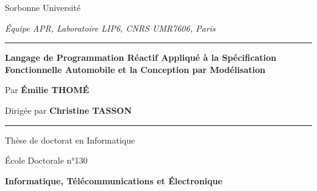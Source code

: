 \begin{titlepage}
    \begin{center}

        \vspace{0.5cm}

        {\LARGE
            Sorbonne Université
        }

        \vspace{0.3cm}

        {\large
            \textit{Équipe APR, Laboratoire LIP6, CNRS UMR7606, Paris}
        }

        \vspace{0.8cm}

        \rule{\linewidth}{0.8pt}

        \vspace{0.3cm}

        {\Large\bfseries
            Langage de Programmation Réactif Appliqué à la Spécification Fonctionnelle Automobile et la Conception par Modélisation
        }

        \vspace{0.3cm}

        {\large\bfseries
            \manuscriptTitle
        }

        \vspace{0.5cm}

        {\large
            Par \textbf{Émilie THOMÉ}

            \vspace{0.3cm}

            Dirigée par \textbf{Christine TASSON}
        }

        \vspace{0.3cm}

        \rule{\linewidth}{0.8pt}

        \vspace{0.8cm}

        {\large
            Thèse de doctorat en Informatique

            \vspace{0.3cm}

            École Doctorale n°130

            \vspace{0.3cm}

            \textbf{Informatique, Télécommunications et Électronique}

            \vspace{0.3cm}

}
\end{center}
\end{titlepage}
